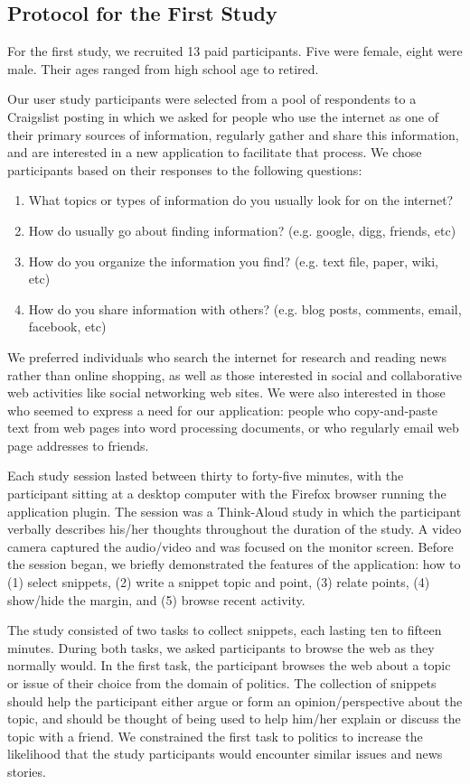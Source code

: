 \documentclass{chi2009}
\begin{document}
\subsection{Protocol for the First Study}

For the first study, we recruited 13 paid participants. Five were female, eight were male. Their ages ranged from high school age to retired. 

Our user study participants were selected from a pool of respondents to a Craigslist posting in which we asked for people who use the internet as one of their primary sources of information, regularly gather and share this information, and are interested in a new application to facilitate that process. We chose participants based on their responses to the following questions:
\begin{enumerate}
	\item What topics or types of information do you usually look for on the internet?
	\item How do usually go about finding information? (e.g. google, digg, friends, etc)
	\item How do you organize the information you find? (e.g. text file, paper, wiki, etc)
	\item How do you share information with others? (e.g. blog posts, comments, email, facebook, etc)
\end{enumerate}
We preferred individuals who search the internet for research and reading news rather than online shopping, as well as those interested in social and collaborative web activities like social networking web sites.  We were also interested in those who seemed to express a need for our application: people who copy-and-paste text from web pages into word processing documents, or who regularly email web page addresses to friends. 

Each study session lasted between thirty to forty-five minutes, with the participant sitting at a desktop computer with the Firefox browser running the application plugin. The session was a Think-Aloud study in which the participant verbally describes his/her thoughts throughout the duration of the study. A video camera captured the audio/video and was focused on the monitor screen. Before the session began, we briefly demonstrated the features of the application: how to (1) select snippets, (2) write a snippet topic and point, (3) relate points, (4) show/hide the margin, and (5) browse recent activity.

The study consisted of two tasks to collect snippets, each lasting ten to fifteen minutes. During both tasks, we asked participants to browse the web as they normally would. In the first task, the participant browses the web about a topic or issue of their choice from the domain of politics. The collection of snippets should help the participant either argue or form an opinion/perspective about the topic, and should be thought of being used to help him/her explain or discuss the topic with a friend.  We constrained the first task to politics to increase the likelihood that the study participants would encounter similar issues and news stories.
\end{document}
